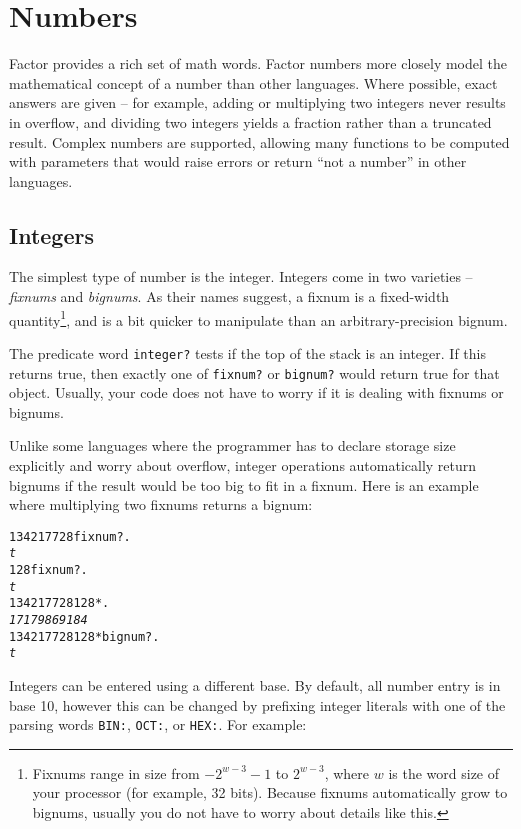 \documentclass[english]{article}
\begin{document}
\section{Numbers}

Factor provides a rich set of math words. Factor numbers more closely model the mathematical concept of a number than other languages. Where possible, exact answers are given -- for example, adding or multiplying two integers never results in overflow, and dividing two integers yields a fraction rather than a truncated result. Complex numbers are supported, allowing many functions to be computed with parameters that would raise errors or return ``not a number'' in other languages.

\subsection{Integers}

The simplest type of number is the integer. Integers come in two varieties -- \emph{fixnums} and \emph{bignums}. As their names suggest, a fixnum is a fixed-width quantity\footnote{Fixnums range in size from $-2^{w-3}-1$ to $2^{w-3}$, where $w$ is the word size of your processor (for example, 32 bits). Because fixnums automatically grow to bignums, usually you do not have to worry about details like this.}, and is a bit quicker to manipulate than an arbitrary-precision bignum.

The predicate word \texttt{integer?} tests if the top of the stack is an integer. If this returns true, then exactly one of \texttt{fixnum?} or \texttt{bignum?} would return true for that object. Usually, your code does not have to worry if it is dealing with fixnums or bignums.

Unlike some languages where the programmer has to declare storage size explicitly and worry about overflow, integer operations automatically return bignums if the result would be too big to fit in a fixnum. Here is an example where multiplying two fixnums returns a bignum:

\begin{alltt}
134217728 fixnum? .
\emph{t}
128 fixnum? .
\emph{t}
134217728 128 * .
\emph{17179869184}
134217728 128 * bignum? .
\emph{t}
\end{alltt}

Integers can be entered using a different base. By default, all number entry is in base 10, however this can be changed by prefixing integer literals with one of the parsing words \texttt{BIN:}, \texttt{OCT:}, or \texttt{HEX:}. For example:
\end{document}
